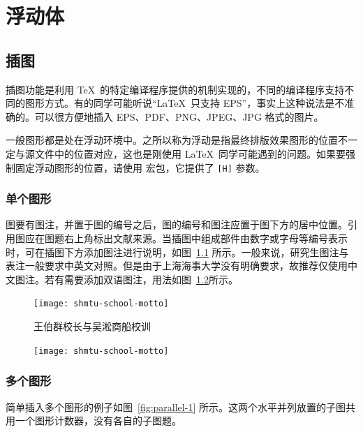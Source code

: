 \chapter{浮动体}

\section{插图}

插图功能是利用 \TeX\ 的特定编译程序提供的机制实现的，不同的编译程序支持不同的图形方式。有的同学可能听说“\LaTeX\ 只支持 EPS”，事实上这种说法是不准确的。\XeTeX 可以很方便地插入 EPS、PDF、PNG、JPEG、JPG 格式的图片。

一般图形都是处在浮动环境中。之所以称为浮动是指最终排版效果图形的位置不一定与源文件中的位置对应，这也是刚使用 \LaTeX\ 同学可能遇到的问题。如果要强制固定浮动图形的位置，请使用  宏包，它提供了 \texttt{[H]} 参数。

\subsection{单个图形}

图要有图注，并置于图的编号之后，图的编号和图注应置于图下方的居中位置。引用图应在图题右上角标出文献来源。当插图中组成部件由数字或字母等编号表示时，可在插图下方添加图注进行说明，如图~\ref{fig:shmtu-school-motto} 所示。一般来说，研究生图注与表注一般要求中英文对照。但是由于上海海事大学没有明确要求，故推荐仅使用中文图注。若有需要添加双语图注，用法如图~\ref{fig:shmtu-school-motto-2}所示。

\begin{figure}[!htp]
	\centering
	\texttt{[image: shmtu-school-motto]}
	\caption{王伯群校长与吴淞商船校训}
	\label{fig:shmtu-school-motto}
\end{figure}

\begin{figure}[!htp]
	\centering
	\texttt{[image: shmtu-school-motto]}
	\label{fig:shmtu-school-motto-2}
\end{figure}

\subsection{多个图形}

简单插入多个图形的例子如图~\ref{fig:parallel-1} 所示。这两个水平并列放置的子图共用一个图形计数器，没有各自的子图题。

